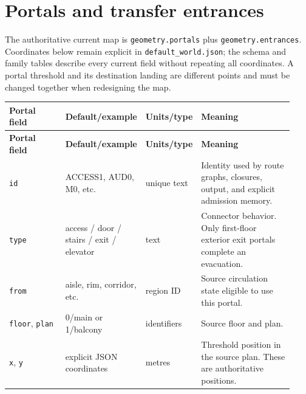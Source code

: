 \documentclass[11pt]{article}
\begin{document}
\section{Portals and transfer entrances}

The authoritative current map is \texttt{geometry.\allowbreak{}portals} plus \texttt{geometry.\allowbreak{}entrances}. Coordinates below remain explicit in \texttt{default\_\allowbreak{}world.\allowbreak{}json}; the schema and family tables describe every current field without repeating all coordinates. A portal threshold and its destination landing are different points and must be changed together when redesigning the map.


{\small\setlength{\tabcolsep}{4pt}

\begin{longtable}{@{}p{0.23\linewidth}p{0.19\linewidth}p{0.13\linewidth}p{0.38\linewidth}@{}}

\toprule

\textbf{Portal field} & \textbf{Default/example} & \textbf{Units/type} & \textbf{Meaning} \\

\midrule\endfirsthead

\toprule

\textbf{Portal field} & \textbf{Default/example} & \textbf{Units/type} & \textbf{Meaning} \\

\midrule\endhead

\bottomrule\endfoot

\texttt{id} & ACCESS1, AUD0, M0, etc. & unique text & Identity used by route graphs, closures, output, and explicit admission memory. \\

\texttt{type} & access / door / stairs / exit / elevator & text & Connector behavior. Only first-floor exterior exit portals complete an evacuation. \\

\texttt{from} & aisle, rim, corridor, etc. & region ID & Source circulation state eligible to use this portal. \\

\texttt{floor}, \texttt{plan} & 0/main or 1/balcony & identifiers & Source floor and plan. \\

\texttt{x}, \texttt{y} & explicit JSON coordinates & metres & Threshold position in the source plan. These are authoritative positions. \\


\end{longtable}}
\end{document}
